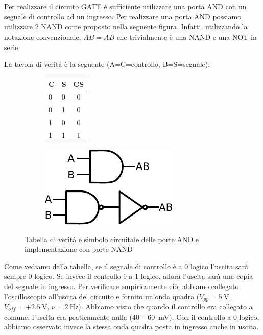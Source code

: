 Per realizzare il circuito GATE è sufficiente utilizzare una porta AND con un segnale di controllo ad un ingresso.
Per realizzare una porta AND possiamo utilizzare 2 NAND come proposto nella seguente figura.
Infatti, utilizzando la notazione convenzionale, $AB=\overline {\overline {AB}}$ che trivialmente è una NAND e una NOT in serie.

La tavola di verità è la seguente (A=C=controllo, B=S=segnale):

\begin{figure}[htpc]
\centering
	\begin{subfigure}[hc]{.4\textwidth}
		\centering
		{\renewcommand{\arraystretch}{1.1}%
		\begin{tabular}{|l|l|c|}
		\hline
		C & S & CS \\
		\hline
		0 & 0 & 0\\
		\hline
		0 & 1 & 0\\
		\hline
		1 & 0 & 0\\
		\hline
		1 & 1 & 1\\
		\hline
		\end{tabular}}
		\label{tab9:AND}
        \end{subfigure}
        \begin{subfigure}[hc]{.4\textwidth}
		\centering
		\includegraphics[width=.5\textwidth]{../E09/latex/AND.pdf}
		\label{cir9:AND}
        \end{subfigure}
\caption{Tabella di verità e simbolo circuitale delle porte AND e implementazione con porte NAND}
\end{figure}

Come vediamo dalla tabella, se il segnale di controllo è a 0 logico l'uscita sarà sempre 0 logico.
Se invece il controllo è a 1 logico, allora l'uscita sarà una copia del segnale in ingresso.
Per verificare empiricamente ciò, abbiamo collegato l'oscilloscopio all'uscita del circuito e fornito un'onda quadra ($V_{pp}=\SI{5}{\volt}$, $V_{off}=+\SI{2.5}{\volt}$, $\nu=\SI{2}{\hertz}$).
Abbiamo visto che quando il controllo era collegato a comune, l'uscita era praticamente nulla (\num{40} -- \SI{60}{\mV}).
Con il controllo a 0 logico, abbiamo osservato invece la stessa onda quadra posta in ingresso anche in uscita.

